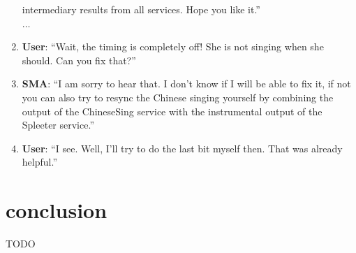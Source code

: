 \documentclass[]{article}
\begin{document}
\begin{enumerate}
  intermediary results from all services.  Hope you like it.''\\
  $\dots$
\item \textbf{User}: ``Wait, the timing is completely off!  She is not
  singing when she should.  Can you fix that?''
\item \textbf{SMA}: ``I am sorry to hear that.  I don't know if I will
  be able to fix it, if not you can also try to resync the Chinese
  singing yourself by combining the output of the ChineseSing service
  with the instrumental output of the Spleeter service.''
\item \textbf{User}: ``I see.  Well, I'll try to do the last bit
  myself then.  That was already helpful.''
\end{enumerate}

\section{conclusion}
TODO



\end{document}
